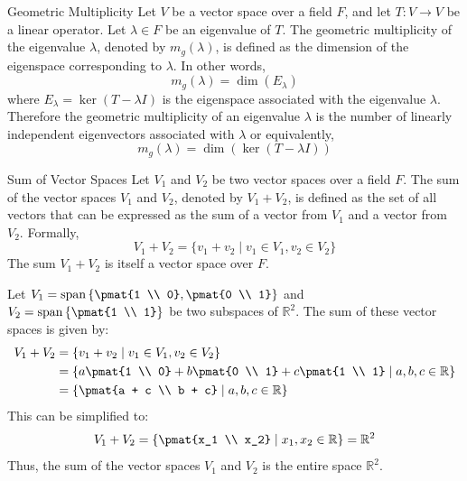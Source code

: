 \documentclass[openany]{book}
\begin{document}
\begin{mydefinition}{Geometric Multiplicity}
    Let $V$ be a vector space over a field $F$, and let $T: V \to V$ be a linear operator. Let $\lambda \in F$ be an eigenvalue of $T$. The geometric multiplicity of the eigenvalue $\lambda$, denoted by $m_g(\lambda)$, is defined as the dimension of the eigenspace corresponding to $\lambda$. In other words,
    $$m_g(\lambda) = \dim(E_\lambda)$$
    where $E_\lambda = \ker(T - \lambda I)$ is the eigenspace associated with the eigenvalue $\lambda$.
    Therefore the geometric multiplicity of an eigenvalue $\lambda$ is the number of linearly independent eigenvectors associated with $\lambda$ or equivalently, 
    $$m_g(\lambda) = \dim(\ker(T - \lambda I))$$
\end{mydefinition}
\begin{mydefinition}{Sum of Vector Spaces}
    Let $V_1$ and $V_2$ be two vector spaces over a field $F$. The sum of the vector spaces $V_1$ and $V_2$, denoted by $V_1 + V_2$, is defined as the set of all vectors that can be expressed as the sum of a vector from $V_1$ and a vector from $V_2$. Formally,
    $$V_1 + V_2 = \{ v_1 + v_2 \mid v_1 \in V_1, v_2 \in V_2 \}$$
    The sum $V_1 + V_2$ is itself a vector space over $F$.
\end{mydefinition}
\begin{example}
    Let $V_1 = \text{span}\left\{\pmat{1 \\ 0}, \pmat{0 \\ 1}\right\}$ and $V_2 = \text{span}\left\{\pmat{1 \\ 1}\right\}$ be two subspaces of $\mathbb{R}^2$. The sum of these vector spaces is given by:
    \[
    \begin{aligned}
    V_1 + V_2 &= \left\{ v_1 + v_2 \mid v_1 \in V_1, v_2 \in V_2 \right\} \\
    &= \left\{ a\pmat{1 \\ 0} + b\pmat{0 \\ 1} + c\pmat{1 \\ 1} \mid a, b, c \in \mathbb{R} \right\} \\
    &= \left\{ \pmat{a + c \\ b + c} \mid a, b, c \in \mathbb{R} \right\}
    \end{aligned}
    \]
    This can be simplified to:
    $$V_1 + V_2 = \left\{ \pmat{x_1 \\ x_2} \mid x_1, x_2 \in \mathbb{R} \right\} = \mathbb{R}^2$$
    Thus, the sum of the vector spaces $V_1$ and $V_2$ is the entire space $\mathbb{R}^2$.
\end{example}
\end{document}

